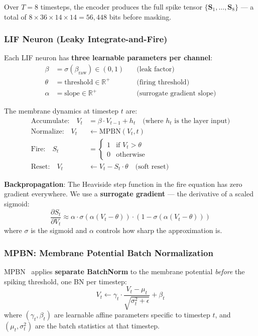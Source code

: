 \documentclass[11pt]{article}
\begin{document}
Over $T{=}8$ timesteps, the encoder produces the full spike tensor $\{\mathbf{S}_1, \ldots, \mathbf{S}_8\}$ --- a total of $8 \times 36 \times 14 \times 14 = 56{,}448$ bits before masking.

\subsubsection{LIF Neuron (Leaky Integrate-and-Fire)}\label{sec:lif}

Each LIF neuron has \textbf{three learnable parameters per channel}:
\begin{align}
    \beta &= \sigma(\beta_{\text{raw}}) \in (0,1) \quad &\text{(leak factor)} \\
    \theta &= \text{threshold} \in \mathbb{R}^+ \quad &\text{(firing threshold)} \\
    \alpha &= \text{slope} \in \mathbb{R}^+ \quad &\text{(surrogate gradient slope)}
\end{align}

The membrane dynamics at timestep $t$ are:
\begin{align}
    \text{Accumulate:} \quad V_t &= \beta \cdot V_{t-1} + h_t \quad \text{(where $h_t$ is the layer input)} \\
    \text{Normalize:} \quad V_t &\leftarrow \text{MPBN}(V_t, t) \\
    \text{Fire:} \quad S_t &= \begin{cases} 1 & \text{if } V_t > \theta \\ 0 & \text{otherwise} \end{cases} \\
    \text{Reset:} \quad V_t &\leftarrow V_t - S_t \cdot \theta \quad \text{(soft reset)}
\end{align}

\textbf{Backpropagation}: The Heaviside step function in the fire equation has zero gradient everywhere. We use a \textbf{surrogate gradient} --- the derivative of a scaled sigmoid:
\[
\frac{\partial S_t}{\partial V_t} \approx \alpha \cdot \sigma(\alpha (V_t - \theta)) \cdot (1 - \sigma(\alpha (V_t - \theta)))
\]
where $\sigma$ is the sigmoid and $\alpha$ controls how sharp the approximation is.

\subsubsection{MPBN: Membrane Potential Batch Normalization}\label{sec:mpbn}

MPBN~\cite{guo2023mpbn} applies \textbf{separate BatchNorm} to the membrane potential \emph{before} the spiking threshold, one BN per timestep:
\[
V_t \leftarrow \gamma_t \cdot \frac{V_t - \mu_t}{\sqrt{\sigma_t^2 + \epsilon}} + \beta_t
\]
where $(\gamma_t, \beta_t)$ are learnable affine parameters specific to timestep $t$, and $(\mu_t, \sigma_t^2)$ are the batch statistics at that timestep.
\end{document}
